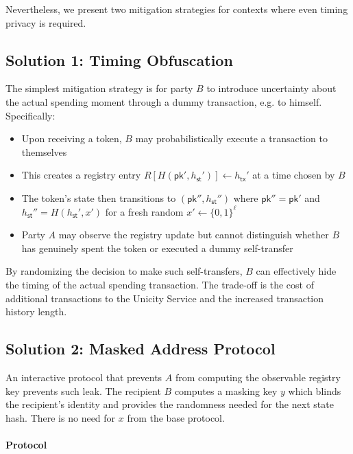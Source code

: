 \documentclass{article}
\newcommand{\pubkey}[0]{\mathsf{pk}}
\newcommand{\sthash}[0]{{h_\mathsf{st}}}
\newcommand{\txhash}[0]{{h_\mathsf{tx}}}
\begin{document}
\noindent Nevertheless, we present two mitigation strategies for contexts where even timing privacy is required.

\subsection{Solution 1: Timing Obfuscation}

The simplest mitigation strategy is for party $B$ to introduce uncertainty about the actual spending moment through a dummy transaction, e.g. to himself. Specifically:

\begin{itemize}
\item Upon receiving a token, $B$ may probabilistically execute a transaction to themselves
\item This creates a registry entry $R[H(\pubkey', \sthash')] \gets \txhash'$ at a time chosen by $B$
\item The token's state then transitions to $(\pubkey'', \sthash'')$ where $\pubkey'' = \pubkey'$ and $\sthash'' = H(\sthash', x')$ for a fresh random $x' \gets \{0,1\}^\ell$
\item Party $A$ may observe the registry update but cannot distinguish whether $B$ has genuinely spent the token or executed a dummy self-transfer
\end{itemize}

\noindent By randomizing the decision to make such self-transfers, $B$ can effectively hide the timing of the actual spending transaction. The trade-off is the cost of additional transactions to the Unicity Service and the increased transaction history length.

\subsection{Solution 2: Masked Address Protocol}

An interactive protocol that prevents $A$ from computing the observable registry key prevents such leak. The recipient $B$ computes a masking key $y$ which blinds the recipient's identity and provides the randomness needed for the next state hash. There is no need for $x$ from the base protocol.

\paragraph{Protocol}
\end{document}
